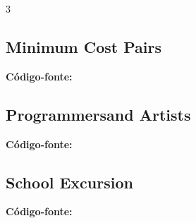 \documentclass[8pt]{extarticle}
\begin{document}
\begin{multicols*}{3}
\subsection{Minimum Cost Pairs}
\begin{caixaenunciado}

\end{caixaenunciado}
\vspace{0.3cm}
\noindent\textbf{Código-fonte:}


\subsection{Programmersand Artists}
\begin{caixaenunciado}

\end{caixaenunciado}
\vspace{0.3cm}
\noindent\textbf{Código-fonte:}


\subsection{School Excursion}
\begin{caixaenunciado}

\end{caixaenunciado}
\vspace{0.3cm}
\noindent\textbf{Código-fonte:}

\end{multicols*}
\pagebreak
\end{document}
